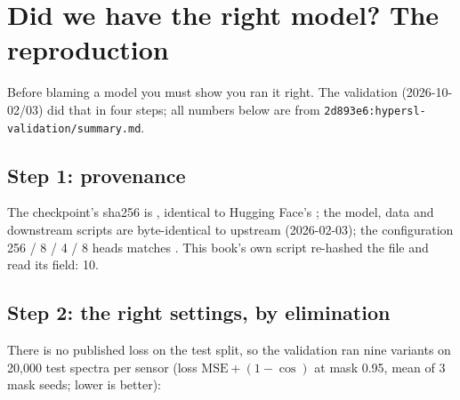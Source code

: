 \section{Did we have the right model? The reproduction}\label{sec:hslwhat:repro}

Before blaming a model you must show you ran it right. The validation (2026-10-02/03) did that in four steps; all
numbers below are from \texttt{2d893e6:hypersl-validation/summary.md}.

\subsection{Step 1: provenance}

The checkpoint's sha256 is , identical to Hugging Face's ;
the model, data and downstream scripts are byte-identical to upstream  (2026-02-03); the configuration
256 / 8 / 4 / 8 heads matches . This book's own script re-hashed the file and read its
 field: 10\tbrk\tagC.

\subsection{Step 2: the right settings, by elimination}

There is no published loss on the test split, so the validation ran nine variants on 20,000 test spectra per sensor
(loss $\text{MSE}+(1-\cos)$ at mask 0.95, mean of 3 mask seeds; lower is better):

